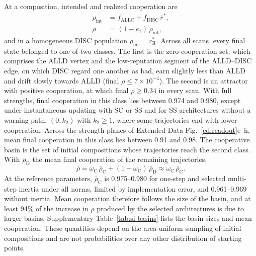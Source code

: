 \documentclass[10pt]{wlscirep}
\newcommand{\rR}{r_{\mathrm{R}}^{*}}
\newcommand{\ALLC}{\mathrm{ALLC}}
\newcommand{\DISC}{\mathrm{DISC}}
\theoremstyle{plain}
\theoremstyle{remark}
\begin{document}
At a composition, intended and realized cooperation are
\begin{equation}
\begin{aligned}
\rho_{\mathrm{int}}&=f_{\ALLC}+f_{\DISC}\,\bar r^*,\\
\rho&=(1-e_1)\,\rho_{\mathrm{int}},
\end{aligned}
\label{eq:s-cooperation}
\end{equation}
and in a homogeneous DISC population $\rho_{\mathrm{int}}=\rR$. Across all scans, every final state belonged to one of two classes. The first is the zero-cooperation set, which comprises the ALLD vertex and the low-reputation segment of the ALLD--DISC edge, on which DISC regard one another as bad, earn slightly less than ALLD and drift slowly towards ALLD (final $\rho\leq7\times10^{-4}$). The second is an attractor with positive cooperation, at which final $\rho\geq0.34$ in every scan. With full strengths, final cooperation in this class lies between 0.974 and 0.980, except under instantaneous updating with SC or SS and for SS architectures without a warning path, $(0,k_2)$ with $k_2\geq1$, where some trajectories end with lower cooperation. Across the strength planes of Extended Data Fig.~\ref{ed:readout}e--h, mean final cooperation in this class lies between 0.91 and 0.98. The cooperative basin is the set of initial compositions whose trajectories reach the second class. With $\bar\rho_{\mathrm D}$ the mean final cooperation of the remaining trajectories,
\begin{equation}
\bar\rho=\omega_{\mathrm C}\,\bar\rho_{\mathrm C}+(1-\omega_{\mathrm C})\,\bar\rho_{\mathrm D}\approx\omega_{\mathrm C}\,\bar\rho_{\mathrm C}.
\label{eq:s-decomposition}
\end{equation}
At the reference parameters, $\bar\rho_{\mathrm C}$ is 0.975--0.980 for one-step and selected multi-step inertia under all norms, limited by implementation error, and 0.961--0.969 without inertia. Mean cooperation therefore follows the size of the basin, and at least 94\% of the increase in $\bar\rho$ produced by the selected architectures is due to larger basins. Supplementary Table~\ref{tab:si-basins} lists the basin sizes and mean cooperation. These quantities depend on the area-uniform sampling of initial compositions and are not probabilities over any other distribution of starting points.
\end{document}
